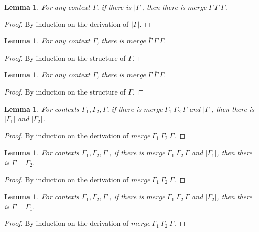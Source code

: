 \documentclass{article}
\newtheorem{lemma}[theorem]{Lemma}
\theoremstyle{definition}
\newcommand{\pure}[1]{|#1|}
\newcommand{\mrg}[3]{merge\ {#1}\ {#2}\ {#3}}
\begin{document}
\begin{lemma}\label{mergepure}
  For any context $\Gamma$, if there is $\pure{\Gamma}$, then there is $\mrg{\Gamma}{\Gamma}{\Gamma}$.
\end{lemma}
\begin{proof}
  By induction on the derivation of $\pure{\Gamma}$.
\end{proof}

\begin{lemma}\label{mergere1}
  For any context $\Gamma$, there is $\mrg{\overline{\Gamma}}{\Gamma}{\Gamma}$.
\end{lemma}
\begin{proof}
  By induction on the structure of $\Gamma$.
\end{proof}

\begin{lemma}\label{mergere2}
  For any context $\Gamma$, there is $\mrg{\Gamma}{\overline{\Gamma}}{\Gamma}$.
\end{lemma}
\begin{proof}
  By induction on the structure of $\Gamma$.
\end{proof}

\begin{lemma}\label{mergepureinv}
  For contexts $\Gamma_1, \Gamma_2, \Gamma$, if there is $\mrg{\Gamma_1}{\Gamma_2}{\Gamma}$ and $\pure{\Gamma}$, then there is $\pure{\Gamma_1}$ and $\pure{\Gamma_2}$.
\end{lemma}
\begin{proof}
  By induction on the derivation of $\mrg{\Gamma_1}{\Gamma_2}{\Gamma}$.
\end{proof}

\begin{lemma}\label{mergepure1}
  For contexts $\Gamma_1, \Gamma_2, \Gamma$ , if there is $\mrg{\Gamma_1}{\Gamma_2}{\Gamma}$ and $\pure{\Gamma_1}$, then there is $\Gamma = \Gamma_2$.
\end{lemma}
\begin{proof}
  By induction on the derivation of $\mrg{\Gamma_1}{\Gamma_2}{\Gamma}$.
\end{proof}

\begin{lemma}\label{mergepure2}
  For contexts $\Gamma_1, \Gamma_2, \Gamma$ , if there is $\mrg{\Gamma_1}{\Gamma_2}{\Gamma}$ and $\pure{\Gamma_2}$, then there is $\Gamma = \Gamma_1$.
\end{lemma}
\begin{proof}
  By induction on the derivation of $\mrg{\Gamma_1}{\Gamma_2}{\Gamma}$.
\end{proof}
\end{document}

